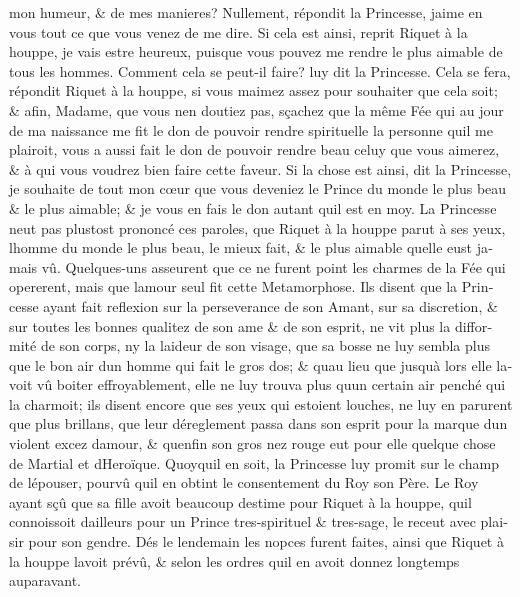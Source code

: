 \documentclass[14pt,a4paper]{memoir}
\begin{document}
{{\begin{otherlanguage}{french}
mon humeur, \& de mes manieres? Nullement, répondit la Princesse,
j\textquotesingle aime en vous tout ce que vous venez de me dire. Si
cela est ainsi, reprit Riquet à la houppe, je vais estre heureux,
puisque vous pouvez me rendre le plus aimable de tous les hommes.
Comment cela se peut-il faire? luy dit la Princesse. Cela se fera,
répondit Riquet à la houppe, si vous m\textquotesingle aimez assez pour
souhaiter que cela soit; \& afin, Madame, que vous n\textquotesingle en
doutiez pas, sçachez que la même Fée qui au jour de ma naissance me fit
le don de pouvoir rendre spirituelle la personne qu\textquotesingle il
me plairoit, vous a aussi fait le don de pouvoir rendre beau celuy que
vous aimerez, \& à qui vous voudrez bien faire cette faveur. Si la chose
est ainsi, dit la Princesse, je souhaite de tout mon cœur que vous
deveniez le Prince du monde le plus beau \& le plus aimable; \& je vous
en fais le don autant qu\textquotesingle il est en moy. La Princesse
n\textquotesingle eut pas plustost prononcé ces paroles, que Riquet à la
houppe parut à ses yeux, l\textquotesingle homme du monde le plus beau,
le mieux fait, \& le plus aimable quelle eust jamais vû. Quelques-uns
asseurent que ce ne furent point les charmes de la Fée qui opererent,
mais que l\textquotesingle amour seul fit cette Metamorphose. Ils disent
que la Princesse ayant fait reflexion sur la perseverance de son Amant,
sur sa discretion, \& sur toutes les bonnes qualitez de son ame \& de
son esprit, ne vit plus la difformité de son corps, ny la laideur de son
visage, que sa bosse ne luy sembla plus que le bon air
d\textquotesingle un homme qui fait le gros dos; \&
qu\textquotesingle au lieu que jusqu\textquotesingle à lors elle
l\textquotesingle avoit vû boiter effroyablement, elle ne luy trouva
plus qu\textquotesingle un certain air penché qui la charmoit; ils
disent encore que ses yeux qui estoient louches, ne luy en parurent que
plus brillans, que leur déreglement passa dans son esprit pour la marque
d\textquotesingle un violent excez d\textquotesingle amour, \&
qu\textquotesingle enfin son gros nez rouge eut pour elle quelque chose
de Martial et d\textquotesingle Heroïque. Quoyqu\textquotesingle il en
soit, la Princesse luy promit sur le champ de l\textquotesingle épouser,
pourvû qu\textquotesingle il en obtint le consentement du Roy son Père.
Le Roy ayant sçû que sa fille avoit beaucoup d\textquotesingle estime
pour Riquet à la houppe, qu\textquotesingle il connoissoit
d\textquotesingle ailleurs pour un Prince tres-spirituel \& tres-sage,
le receut avec plaisir pour son gendre. Dés le lendemain les nopces
furent faites, ainsi que Riquet à la houppe l\textquotesingle avoit
prévû, \& selon les ordres qu\textquotesingle il en avoit donnez
longtemps auparavant.


\end{otherlanguage}}}
\end{document}
